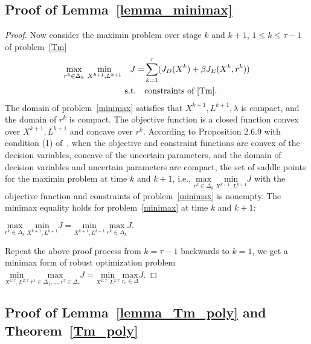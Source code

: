 \documentclass[10pt,twocolumn,twoside,english]{IEEEtran}
\begin{document}
\subsection{Proof of Lemma~\ref{lemma_minimax}}
\label{appendix_minimax}
\begin{proof}
Now consider the maximin problem over stage $k$ and $k+1$, $1\leqslant k \leqslant \tau-1$ of problem~\eqref{Tm}
\begin{align}
\begin{split}
\underset{r^{k}\in\Delta_k}{\text{max}}\ \underset{X^{k+1},L^{k+1}}{\text{min}}\quad J =&\sum_{k=1}^{\tau} (J_D(X^k)+\beta J_E(X^k,r^k))\\
\text{s.t.}\quad &\text{constraints of~\eqref{Tm}}. 
\end{split}
\label{minimax}
\end{align}
The domain of problem~\eqref{minimax} satisfies that $X^{k+1}, L^{k+1}, \lambda$ is compact, and the domain of $r^{k}$ is compact. The objective function is a closed function convex over $X^{k+1}, L^{k+1}$ and concave over $r^{k}$. According to Proposition $2.6.9$ with condition (1) of~\cite{analysis_conv}, when the objective and constraint functions are convex of the decision variables, concave of the uncertain parameters, and the domain of decision variables and uncertain parameters are compact, the set of saddle points for the maximin problem at time $k$ and $k+1$, i.e., $\underset{r^{k}\in\Delta_k}{\text{max}}\ \underset{X^{k+1},L^{k+1}}{\text{min}} J$ with the objective function and constraints of problem~\eqref{minimax} is nonempty. The minimax equality holds for problem~\eqref{minimax} at time $k$ and $k+1$: 
\\\centerline{$\underset{r^{k}\in\Delta_k}{\text{max}}\ \underset{X^{k+1},L^{k+1}}{\text{min}} J =\underset{X^{k+1},L^{k+1}}{\text{min}}\ \underset{r^{k}\in\Delta_k}{\text{max}} J.
$}
Repeat the above proof process from $k=\tau-1$ backwards to $k=1$, we get a minimax form of robust optimization problem $\underset{X^{1:\tau},L^{2:\tau}}{\text{min}}\ \underset{r^{1}\in\Delta_1, \dots, r^{\tau} \in \Delta_{\tau}}{\text{max}} J=\underset{X^{1:\tau},L^{2:\tau}}{\text{min}}\ \underset{r_c \in \Delta}{\text{max}} J$. \end{proof}



\subsection{Proof of Lemma~\ref{lemma_Tm_poly} and Theorem~\ref{Tm_poly}}
\label{appendix_poly}
\end{document}
